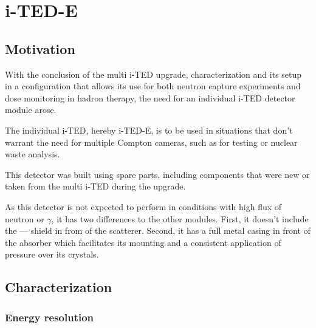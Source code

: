\chapter{i-TED-E}\label{ch:e}

\section{Motivation}\label{sec:motivation-e}

With the conclusion of the multi \ac{i-TED} upgrade, characterization and its setup in a configuration that allows its use for both neutron capture experiments and dose monitoring in hadron therapy, the need for an individual \ac{i-TED} detector module arose.

The individual \ac{i-TED}, hereby \ac{i-TED}-E, is to be used in situations that don't warrant the need for multiple Compton cameras, such as for testing or nuclear waste analysis.

This detector was built using spare parts, including components that were new or taken from the multi \ac{i-TED} during the upgrade.

As this detector is not expected to perform in conditions with high flux of neutron or $\gamma$, it has two differences to the other modules. First, it doesn't include the --- shield in from of the scatterer. Second, it has a full metal casing in front of the absorber which facilitates its mounting and a consistent application of pressure over its crystals.

\section{Characterization}\label{sec:characterization-e}

\subsection{Energy resolution}

